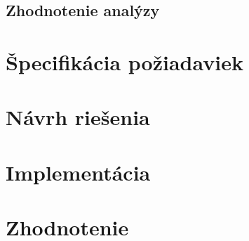 \documentclass[a4paper,slovak,12pt,appendix]{article}
\begin{document}

\subsection{Zhodnotenie analýzy}


\newpage
\section{Špecifikácia požiadaviek}
\label{specification}


\newpage
\section{Návrh riešenia}
\label{solution-design}


\newpage
\section{Implementácia}
\label{implementation}


\newpage
\section{Zhodnotenie}
\label{evaluation}

\end{document}
